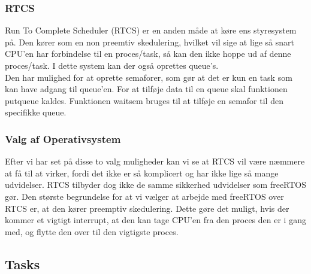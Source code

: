 \subsubsection{RTCS}

Run To Complete Scheduler (RTCS) er en anden måde at køre ens styresystem på. Den kører som en non preemtiv skedulering, hvilket vil sige at lige så snart CPU'en har forbindelse til en proces/task, så kan den ikke hoppe ud af denne proces/task. I dette system kan der også oprettes queue's.
\\
Den har mulighed for at oprette semaforer, som gør at det er kun en task som kan have adgang til queue'en. For at tilføje data til en queue skal funktionen put\textunderscore queue kaldes. Funktionen wait\textunderscore sem bruges til at tilføje en semafor til den specifikke queue.

\subsubsection{Valg af Operativsystem}

Efter vi har set på disse to valg muligheder kan vi se at RTCS vil være næmmere at få til at virker, fordi det ikke er så komplicert og har ikke lige så mange udvidelser. RTCS tilbyder dog ikke de samme sikkerhed udvidelser som freeRTOS gør. Den største begrundelse for at vi vælger at arbejde med freeRTOS over RTCS er, at den kører preemptiv skedulering. Dette gøre det muligt, hvis der kommer et vigtigt interrupt, at den kan tage CPU'en fra den proces den er i gang med, og flytte den over til den vigtigste proces.

\subsection{Tasks}

